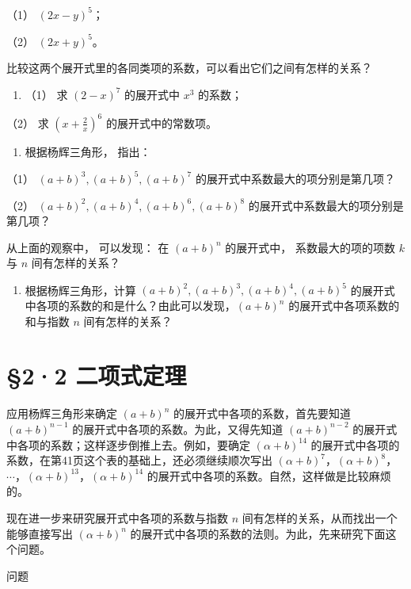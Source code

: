 （1） \((2x - y)^{5}\)；

（2） \((2x + y)^{5}\)。

比较这两个展开式里的各同类项的系数，可以看出它们之间有怎样的关系？

\begin{enumerate}[start=3]
\item
  （1） 求 \((2 - x)^7\) 的展开式中 \(x^3\) 的系数；
\end{enumerate}

（2） 求 \(\left(x + \frac{2}{x}\right)^6\) 的展开式中的常数项。

\begin{enumerate}[start=4]
\item
  根据杨辉三角形， 指出：
\end{enumerate}

（1） \((a + b)^{3}, (a + b)^{5}, (a + b)^{7}\)
的展开式中系数最大的项分别是第几项？

（2） \((a + b)^2, (a + b)^4, (a + b)^6, (a + b)^8\)
的展开式中系数最大的项分别是第几项？

从上面的观察中， 可以发现： 在 \((a + b)^n\) 的展开式中，
系数最大的项的项数 \(k\) 与 \(n\) 间有怎样的关系？

\begin{enumerate}[start=5]
\item
  根据杨辉三角形，计算 \((a + b)^2, (a + b)^3, (a + b)^4, (a + b)^5\)
  的展开式中各项的系数的和是什么？由此可以发现，\((a + b)^n\)
  的展开式中各项系数的和与指数 \(n\) 间有怎样的关系？
\end{enumerate}

\section{§2·2 二项式定理}

应用杨辉三角形来确定 \((a + b)^n\) 的展开式中各项的系数，首先要知道
\((a + b)^{n - 1}\) 的展开式中各项的系数。为此，又得先知道
\((a + b)^{n - 2}\) 的展开式中各项的系数；这样逐步倒推上去。例如，要确定
\((\alpha + b)^{14}\)
的展开式中各项的系数，在第41页这个表的基础上，还必须继续顺次写出
\((\alpha + b)^7\)，\((\alpha + b)^8\)，\(\cdots\)，\((\alpha + b)^{13}\)，\((\alpha + b)^{14}\)
的展开式中各项的系数。自然，这样做是比较麻烦的。

现在进一步来研究展开式中各项的系数与指数 \(n\)
间有怎样的关系，从而找出一个能够直接写出 \((\alpha + b)^n\)
的展开式中各项的系数的法则。为此，先来研究下面这个问题。

问题

